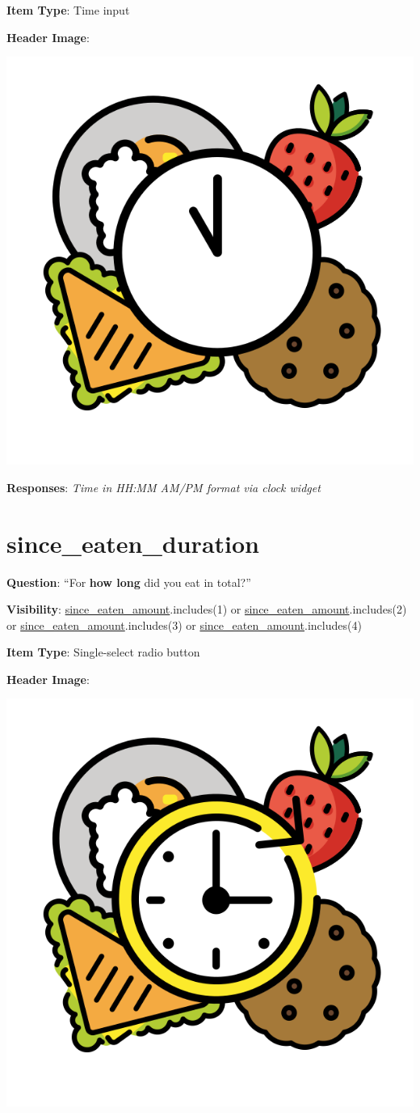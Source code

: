 \documentclass[]{book}
\begin{document}
\textbf{Item Type}: Time input

\textbf{Header Image}:

\begin{flushleft}\includegraphics[width=0.33\linewidth]{downloadFigs4latex_NIMH_Applet_Codebook/since_eaten_when_headerImg} \end{flushleft}

\textbf{Responses}: \emph{Time in HH:MM AM/PM format via clock widget}

\hypertarget{since_eaten_duration}{%
\section{since\_eaten\_duration}\label{since_eaten_duration}}

\textbf{Question}: ``For \textbf{how long} did you eat in total?''

\textbf{Visibility}: \protect\hyperlink{since_eaten_amount}{since\_eaten\_amount}.includes(1) or \protect\hyperlink{since_eaten_amount}{since\_eaten\_amount}.includes(2) or \protect\hyperlink{since_eaten_amount}{since\_eaten\_amount}.includes(3) or \protect\hyperlink{since_eaten_amount}{since\_eaten\_amount}.includes(4)

\textbf{Item Type}: Single-select radio button

\textbf{Header Image}:

\begin{flushleft}\includegraphics[width=0.33\linewidth]{downloadFigs4latex_NIMH_Applet_Codebook/since_eaten_duration_headerImg} \end{flushleft}
\end{document}
